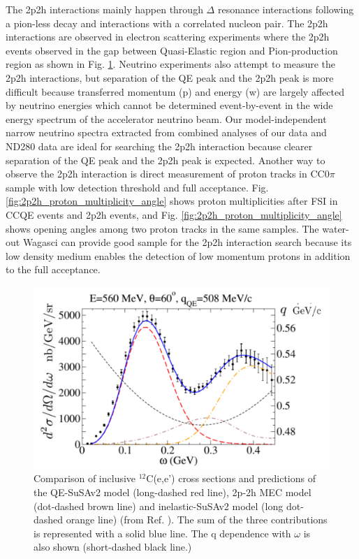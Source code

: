 The 2p2h interactions mainly happen through $\Delta$ resonance interactions following a pion-less decay and interactions with a correlated nucleon pair.
The 2p2h interactions are observed in electron scattering experiments \cite{escattering} where the 2p2h events observed in the gap between Quasi-Elastic region and Pion-production region as shown in Fig. \ref{fig:electrono_scattering_data}.
Neutrino experiments also attempt to measure the 2p2h interactions, but separation of the QE peak and the 2p2h peak is more difficult because transferred momentum (p) and energy (w) are largely affected by  neutrino energies which cannot be determined event-by-event in the wide energy spectrum of the accelerator neutrino beam.
Our model-independent narrow neutrino spectra extracted from combined analyses of our data and ND280 data are ideal for searching the 2p2h interaction because clearer separation of the QE peak and the 2p2h peak is expected.
Another way to observe the 2p2h interaction is direct measurement of proton tracks in CC0$\pi$ sample with low detection threshold and full acceptance.
Fig. \ref{fig:2p2h_proton_multiplicity_angle} shows proton multiplicities after FSI in CCQE events and 2p2h events, and Fig. \ref{fig:2p2h_proton_multiplicity_angle} shows opening angles among two proton tracks in the same samples.
The water-out Wagasci can provide good sample for the 2p2h interaction search because its low density medium enables the detection of low momentum protons in addition to the full acceptance.

\begin{figure}[tbh]
\begin{center}
\includegraphics[width=0.6\linewidth]{fig/escattering.pdf}
\end{center}
\caption{
Comparison of inclusive $^{12}$C(e,e') cross sections and predictions of the QE-SuSAv2 model (long-dashed red line), 2p-2h MEC model (dot-dashed brown line) and inelastic-SuSAv2 model (long dot-dashed orange line) (from Ref. \cite{escattering}).
The sum of the three contributions is represented with a solid blue line.
The q dependence with $\omega$ is also shown (short-dashed black line.)
}
\label{fig:electrono_scattering_data}
\end{figure}

